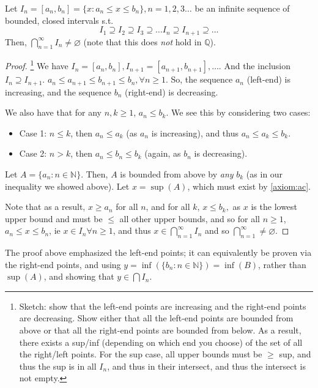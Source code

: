 \documentclass[12pt]{article}
\begin{document}
\begin{theorem}
  Let $I_n = [a_n, b_n] = \{x : a_n \leq x \leq b_n\}, n  = 1,2,3 \dots$ be an infinite sequence of bounded, closed intervals s.t. \[I_1 \supseteq I_2 \supseteq I_3 \supseteq \dots I_n \supseteq I_{n+1} \supseteq \dots \]
  Then, $\bigcap_{n=1}^\infty I_n \neq \varnothing$ (note that this does \emph{not} hold in $\mathbb{Q}$).
\end{theorem}
\begin{proof}[Proof]\footnote{Sketch: show that the left-end points are increasing and the right-end points are decreasing. Show either that all the left-end points are bounded from above or that all the right-end points are bounded from below. As a result, there exists a sup/inf (depending on which end you choose) of the set of all the right/left points. For the sup case, all upper bounds must be $\geq$ sup, and thus the sup is in all $I_n$, and thus in their intersect, and thus the intersect is not empty.}
  We have $I_n = [a_n, b_n], I_{n+1} = [a_{n+1}, b_{n+1}], \dots$. And the inclusion $I_n \supseteq I_{n+1}$. $a_n \leq a_{n+1} \leq b_{n+1} \leq b_{n}, \forall n \geq 1$. So, the sequence $a_n$ (left-end) is increasing, and the sequence $b_n$ (right-end) is decreasing. 
  
  We also have that for any $n, k \geq 1$, $a_n \leq b_k$. We see this by considering two cases:
  \begin{itemize}
    \item Case 1: $n \leq k$, then $a_n \leq a_k$ (as $a_n$ is increasing), and thus $a_n \leq a_k \leq b_k$.
    \item Case 2: $n > k$, then $a_n \leq b_n \leq b_k$ (again, as $b_n$ is decreasing). 
  \end{itemize}
  Let $A = \{a_n : n \in \mathbb{N}\}$. Then, $A$ is bounded from above by \emph{any} $b_k$ (as in our inequality we showed above). Let $x = \sup(A)$, which must exist by \cref{axiom:ac}.

  Note that as a result, \(x \geq a_n\) for all $n$, and for all $k$, \(x \leq b_k,\) as $x$ is the lowest upper bound and must be $\leq$ all other upper bounds, and so for all $n \geq 1$, $a_n \leq x \leq b_n$, ie $x \in I_n \forall n \geq 1$, and thus $x \in \bigcap_{n=1}^{\infty} I_n$ and so $\bigcap_{n=1}^{\infty} \neq \varnothing$.
\end{proof}

\begin{remark}
  The proof above emphasized the left-end points; it can equivalently be proven via the right-end points, and using $y=\inf(\{b_n : n \in \mathbb{N}\}) = \inf(B)$, rather than $\sup(A)$, and showing that $y \in \bigcap I_n$.
\end{remark}
\end{document}
